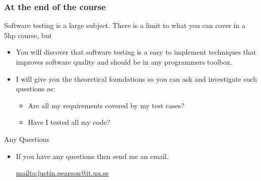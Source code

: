 \documentclass{beamer}
\begin{document}
\begin{frame}
  \frametitle{At the end of the course}
  Software testing is a large subject. There is a limit to what you
  can cover in a 5hp course, but 
  \begin{itemize}
  \item You will discover that software testing is a easy to implement
    techniques that improves software quality and should be in any
    programmers toolbox.
  \item I will give you the theoretical foundations so you can ask
    and investigate such questions as:
    \begin{itemize}
    \item Are all my requirements covered by my test cases?
    \item Have I tested all my code?
    \end{itemize}
  \end{itemize}
\end{frame}
\begin{frame}{Any Questions}
  \begin{itemize}
  \item If you have any questions then send me an email.
    \begin{center}
      \url{mailto:justin.pearson@it.uu.se}
    \end{center}
  \end{itemize}
  
\end{frame}
%
\end{document}
